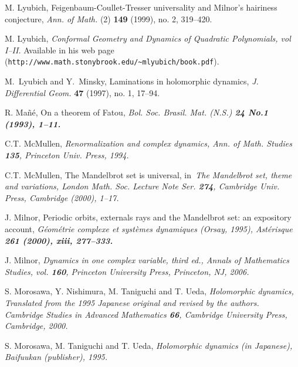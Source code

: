 \documentclass[12pt, reqno, a4paper]{amsart}
\theoremstyle{plain}
\theoremstyle{definition}
\begin{document}
\begin{thebibliography}{99}
M. Lyubich, 
Feigenbaum-Coullet-Tresser universality and Milnor's hairiness conjecture,
{\it Ann. of Math.} (2) {\bf 149} (1999), no. 2, 319--420.


M. Lyubich,
{\it 
Conformal Geometry and Dynamics of Quadratic Polynomials, vol I--II.
} Available in his web page 
(\verb|http://www.math.stonybrook.edu/~mlyubich/book.pdf|).



M.~Lyubich and Y.~Minsky, Laminations in holomorphic dynamics,
{\it J. Differential Geom.} {\bf 47} (1997), no. 1, 17--94. 






R. Ma\~n\'e, 
On a theorem of Fatou, \it
Bol. Soc. Brasil. Mat. (N.S.) \bf 24 \rm No.1 (1993), 1--11.





C.T. McMullen, \it
Renormalization and complex dynamics\rm, 
Ann. of Math. Studies {\bf 135}, Princeton Univ. Press, 1994. 



C.T. McMullen, 
The Mandelbrot set is universal, 
in\it \ The Mandelbrot set, theme and variations\rm, London Math. Soc. 
Lecture Note Ser. {\bf 274}, Cambridge Univ. Press, Cambridge (2000), 
1--17.


J. Milnor, 
Periodic orbits, externals rays and the Mandelbrot set: an expository account, 
\it G\'eom\'etrie complexe et syst\`emes dynamiques \rm(Orsay, 1995), 
Ast\'erisque \bf 261 \rm (2000), xiii, 277--333.


J. Milnor, \it
Dynamics in one complex variable, third ed.\rm, 
Annals of Mathematics Studies, vol. {\bf 160}, Princeton University Press,
Princeton, NJ, 2006.


S. Morosawa, Y. Nishimura, M. Taniguchi and T. Ueda, \it 
Holomorphic dynamics, \rm Translated from the 1995 Japanese original 
and revised by the authors. Cambridge Studies in Advanced Mathematics 
{\bf 66}, Cambridge University Press, Cambridge, 2000.


S. Morosawa, M. Taniguchi and T. Ueda, 
\it Holomorphic dynamics \rm (in Japanese), 
Baifuukan (publisher), 1995.



\end{thebibliography}
\end{document}
